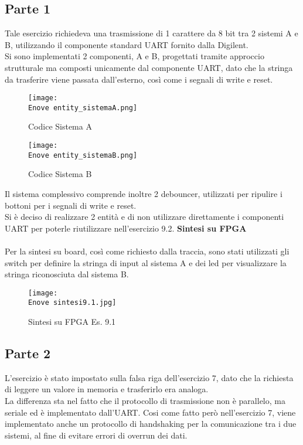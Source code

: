 \documentclass[12pt]{article}
\def \Enove {Allegati/Esercizio9/}
\begin{document}
\subsection{Parte 1}
Tale esercizio richiedeva una trasmissione di 1 carattere da 8 bit tra 2 sistemi A e B, utilizzando il componente standard UART fornito dalla Digilent.
\\Si sono implementati 2 componenti, A e B, progettati tramite approccio strutturale ma composti unicamente dal componente UART, dato che la stringa da trasferire viene passata dall’esterno, così come i segnali di write e reset.
\begin{figure}[ht]
    \centering
    \texttt{[image: \\Enove entity\_sistemaA.png]}
    \caption{Codice Sistema A}
\end{figure}
\begin{figure}[ht]
    \centering
    \texttt{[image: \\Enove entity\_sistemaB.png]}
    \caption{Codice Sistema B}
\end{figure}
\newpage
Il sistema complessivo comprende inoltre 2 debouncer, utilizzati per ripulire i bottoni per i segnali di write e reset.
\\Si è deciso di realizzare 2 entità e di non utilizzare direttamente i componenti UART per poterle riutilizzare nell’esercizio 9.2.
\clearpage
{\large \textbf{Sintesi su FPGA}}
\\\\Per la sintesi su board, così come richiesto dalla traccia, sono stati utilizzati gli switch per definire la stringa di input al sistema A e dei led per visualizzare la stringa riconosciuta dal sistema B.
\begin{figure}[ht]
    \centering
    \texttt{[image: \\Enove sintesi9.1.jpg]}
    \caption{Sintesi su FPGA Es. 9.1}
\end{figure}
\clearpage
\subsection{Parte 2}
L’esercizio è stato impostato sulla falsa riga dell’esercizio 7, dato che la richiesta di leggere un valore in memoria e trasferirlo era analoga.
\\La differenza sta nel fatto che il protocollo di trasmissione non è parallelo, ma seriale ed è implementato dall’UART. Cosi come fatto però nell’esercizio 7, viene implementato anche un protocollo di handshaking per la comunicazione tra i due sistemi, al fine di evitare errori di overrun dei dati.
\end{document}
